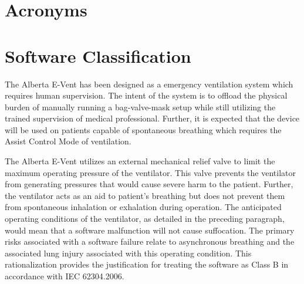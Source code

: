 \documentclass[]{article}
\begin{document}

\clearpage

\section{Acronyms}

\begin{acronym}
	
	
	
	
	
	
	
	
\end{acronym}


\clearpage

\section{Software Classification}
\label{sect:software_class}
The Alberta E-Vent has been designed as a emergency ventilation system which requires human supervision. The intent of the system is to offload the physical burden of manually running a bag-valve-mask setup while still utilizing the trained supervision of medical professional. Further, it is expected that the device will be used on patients capable of spontaneous breathing which requires the Assist Control Mode of ventilation.

The Alberta E-Vent utilizes an external mechanical relief valve to limit the maximum operating pressure of the ventilator.  This valve prevents the ventilator from generating pressures that would cause severe harm to the patient.  Further, the ventilator acts as an aid to patient's breathing but does not prevent them from spontaneous inhalation or exhalation during operation.  The anticipated operating conditions of the ventilator, as detailed in the preceding paragraph, would mean that a software malfunction will not cause suffocation.  The primary risks associated with a software failure relate to asynchronous breathing and the associated lung injury associated with this operating condition.  This rationalization provides the justification for treating the software as Class B in accordance with IEC 62304.2006.
\end{document}
